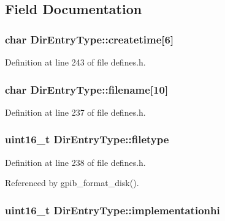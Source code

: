 \subsection{Field Documentation}
\subsubsection[{\texorpdfstring{createtime}{createtime}}]{\setlength{\rightskip}{0pt plus 5cm}char Dir\+Entry\+Type\+::createtime\mbox{[}6\mbox{]}}\hypertarget{structDirEntryType_a627fd55537c73d4fee596b140e106c01}{}\label{structDirEntryType_a627fd55537c73d4fee596b140e106c01}


Definition at line 243 of file defines.\+h.

\subsubsection[{\texorpdfstring{filename}{filename}}]{\setlength{\rightskip}{0pt plus 5cm}char Dir\+Entry\+Type\+::filename\mbox{[}10\mbox{]}}\hypertarget{structDirEntryType_aa60fae0a6b7ba9c966cbcf46e555f396}{}\label{structDirEntryType_aa60fae0a6b7ba9c966cbcf46e555f396}


Definition at line 237 of file defines.\+h.

\subsubsection[{\texorpdfstring{filetype}{filetype}}]{\setlength{\rightskip}{0pt plus 5cm}uint16\+\_\+t Dir\+Entry\+Type\+::filetype}\hypertarget{structDirEntryType_ada14562440087858ebf04bc4c81eedd2}{}\label{structDirEntryType_ada14562440087858ebf04bc4c81eedd2}


Definition at line 238 of file defines.\+h.



Referenced by gpib\+\_\+format\+\_\+disk().

\subsubsection[{\texorpdfstring{implementationhi}{implementationhi}}]{\setlength{\rightskip}{0pt plus 5cm}uint16\+\_\+t Dir\+Entry\+Type\+::implementationhi}\hypertarget{structDirEntryType_a27a15eea3264d44c9e93e3be77093151}{}\label{structDirEntryType_a27a15eea3264d44c9e93e3be77093151}


